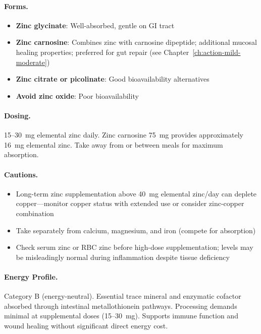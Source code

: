 \paragraph{Forms.}
\begin{itemize}
    \item \textbf{Zinc glycinate}: Well-absorbed, gentle on GI tract
    \item \textbf{Zinc carnosine}: Combines zinc with carnosine dipeptide; additional mucosal healing properties; preferred for gut repair (see Chapter~\ref{ch:action-mild-moderate})
    \item \textbf{Zinc citrate or picolinate}: Good bioavailability alternatives
    \item \textbf{Avoid zinc oxide}: Poor bioavailability
\end{itemize}

\paragraph{Dosing.} 15--30~mg elemental zinc daily. Zinc carnosine 75~mg provides approximately 16~mg elemental zinc. Take away from or between meals for maximum absorption.

\paragraph{Cautions.}
\begin{itemize}
    \item Long-term zinc supplementation above 40~mg elemental zinc/day can deplete copper---monitor copper status with extended use or consider zinc-copper combination
    \item Take separately from calcium, magnesium, and iron (compete for absorption)
    \item Check serum zinc or RBC zinc before high-dose supplementation; levels may be misleadingly normal during inflammation despite tissue deficiency
\end{itemize}

\paragraph{Energy Profile.}
Category B (energy-neutral). Essential trace mineral and enzymatic cofactor absorbed through intestinal metallothionein pathways. Processing demands minimal at supplemental doses (15--30~mg). Supports immune function and wound healing without significant direct energy cost.

